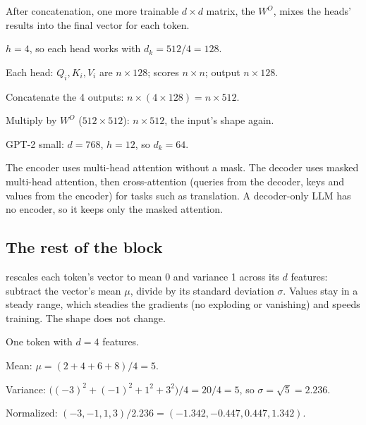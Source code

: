 \begin{definition}
After concatenation, one more trainable $d \times d$ matrix, the  $W^O$, mixes the heads' results into the final vector for each token.
\end{definition}

\begin{example}[Four heads on $d = 512$]
$h = 4$, so each head works with $d_k = 512/4 = 128$.
\begin{steps}
  \item Each head: $Q_i, K_i, V_i$ are $n \times 128$; scores $n \times n$; output $n \times 128$.
  \item Concatenate the 4 outputs: $n \times (4 \times 128) = n \times 512$.
  \item Multiply by $W^O$ ($512 \times 512$): $n \times 512$, the input's shape again.
\end{steps}
GPT-2 small: $d = 768$, $h = 12$, so $d_k = 64$.
\end{example}

\begin{remark}
The encoder uses multi-head attention without a mask. The decoder uses masked multi-head attention, then cross-attention (queries from the decoder, keys and values from the encoder) for tasks such as translation. A decoder-only LLM has no encoder, so it keeps only the masked attention.
\end{remark}

\subsection*{The rest of the block}

\begin{definition}
 rescales each token's vector to mean 0 and variance 1 across its $d$ features: subtract the vector's mean $\mu$, divide by its standard deviation $\sigma$. Values stay in a steady range, which steadies the gradients (no exploding or vanishing) and speeds training. The shape does not change.
\end{definition}

\begin{example}[Normalizing $(2, 4, 6, 8)$]
One token with $d = 4$ features.
\begin{steps}
  \item Mean: $\mu = (2 + 4 + 6 + 8)/4 = 5$.
  \item Variance: $\big((-3)^2 + (-1)^2 + 1^2 + 3^2\big)/4 = 20/4 = 5$, so $\sigma = \sqrt5 = 2.236$.
  \item Normalized: $(-3, -1, 1, 3)/2.236 = (-1.342, -0.447, 0.447, 1.342)$.
\end{steps}
\end{example}

